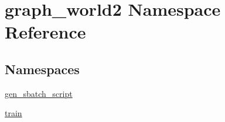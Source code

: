 \hypertarget{namespacegraph__world2}{}\section{graph\+\_\+world2 Namespace Reference}
\label{namespacegraph__world2}
\subsection*{Namespaces}
\begin{DoxyCompactItemize}
\item 
 \hyperlink{namespacegraph__world2_1_1gen__sbatch__script}{gen\+\_\+sbatch\+\_\+script}
\item 
 \hyperlink{namespacegraph__world2_1_1train}{train}
\end{DoxyCompactItemize}
